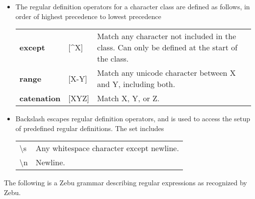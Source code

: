 \documentclass[12pt]{article}
\begin{document}
\begin{itemize}
\item The regular definition operators for a character class are defined as follows, in order of highest precedence to lowest precedence

\begin{footnotesize}
\begin{tabular}{l l l}
\textbf{except}     & [\textasciicircum X]  & Match any character not included in the class. Can only be defined at the start of the class. \\
\textbf{range}      & [X-Y]                 & Match any unicode character between X and Y, including both. \\
\textbf{catenation} & [XYZ]                 & Match X, Y, or Z. \\
\end{tabular}
\end{footnotesize}

\item Backslash escapes regular definition operators, and is used to access the setup of predefined regular definitions. The set includes

\begin{footnotesize}
\begin{tabular}{l l}
\textbackslash s & Any whitespace character except newline. \\
\textbackslash n & Newline. \\
\end{tabular}
\end{footnotesize}

\end{itemize}

The following is a Zebu grammar describing regular expressions as recognized by Zebu.
\end{document}
